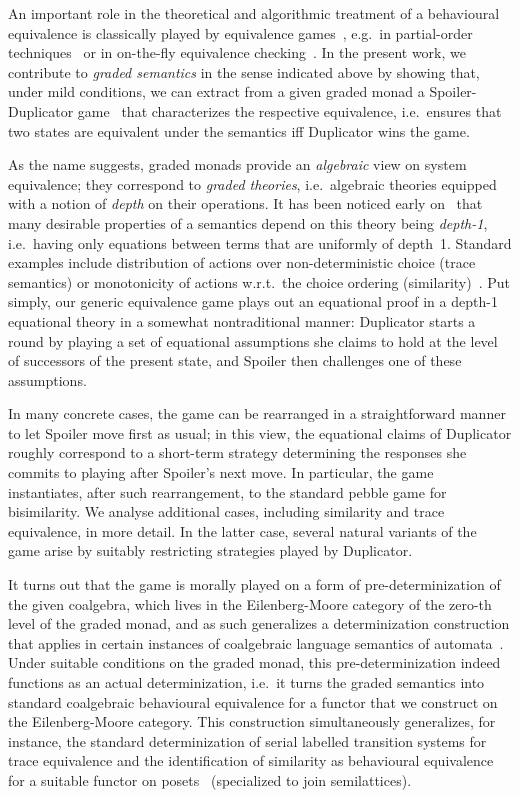 \documentclass[sigconf,
			final%
			nonacm
                        ]{acmart}
\numberwithin{equation}{section}
\numberwithin{equation}{section}
\theoremstyle{plain}
\theoremstyle{definition}
\begin{document}
An important role in the theoretical and algorithmic treatment of a
behavioural equivalence is classically played by equivalence
games~\cite{Glabbeek90,Stirling99}, e.g.~in partial-order
techniques~\cite{hnw:por-bisimulation-checking} or in on-the-fly
equivalence checking~\cite{h:bisim-verif-journal}. In the present
work, we contribute to \emph{graded semantics} in the sense indicated
above by showing that, under mild conditions, we can extract from a
given graded monad a Spoiler-Duplicator game~\cite{Stirling99} that
characterizes the respective equivalence, i.e.~ensures that two states
are equivalent under the semantics iff Duplicator wins the game.

As the name suggests, graded monads provide an \emph{algebraic} view
on system equivalence; they correspond to \emph{grad\-ed theories},
i.e.~algebraic theories equipped with a notion of \emph{depth} on
their operations. It has been noticed early on~\cite{MPS15} that many
desirable properties of a semantics depend on this theory being
\emph{depth-1}, i.e.~having only equations between terms that are
uniformly of depth~1. Standard examples include distribution of
actions over non-deterministic choice (trace semantics) or
monotonicity of actions w.r.t.~the choice ordering
(similarity)~\cite{DMS19}. Put simply, our generic equivalence game
plays out an equational proof in a depth-1 equational theory in a
somewhat nontraditional manner: %
Duplicator starts a round by playing a set of equational assumptions
she claims to hold at the level of successors of the present state,
and Spoiler then challenges one of these assumptions.
              										
In many concrete cases, the game can be rearranged in a straightforward
manner to let Spoiler move first as usual; in this view, the equational claims
of Duplicator roughly correspond to a short-term strategy determining the
responses she commits to playing after Spoiler's next move. In particular,
the game instantiates, after such rearrangement, to the standard pebble
game for bisimilarity. We analyse additional cases, including similarity
and trace equivalence, in more detail. In the latter case, several natural
variants of the game arise by suitably restricting strategies played by
Duplicator.

It turns out that the game is morally played on a form of
pre-determinization of the given coalgebra, which lives in the
Eilenberg-Moore category of the zero-th level of the graded monad, and as
such generalizes a determinization construction that applies in
certain instances of coalgebraic language semantics of
automata~\cite{JSS15}.  Under suitable conditions on the graded monad,
this pre-determinization indeed functions as an actual
determinization, i.e.~it turns the graded semantics into standard
coalgebraic behavioural equivalence for a functor that we construct on
the Eilenberg-Moore category. This construction simultaneously
generalizes, for instance, the standard determinization of serial labelled
transition systems for trace equivalence and the identification of
similarity as behavioural equivalence for a suitable functor on
posets~\cite{KKV12} (specialized to join
semilattices).
\end{document}
